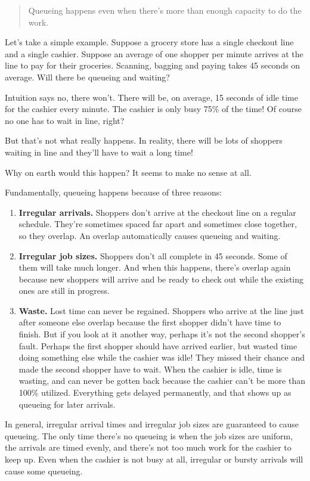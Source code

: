 \documentclass{vivid_layout_pdf}
\begin{document}
\begin{quote}
Queueing happens even when there's more than enough capacity to do the work.
\end{quote}

Let's take a simple example. Suppose a grocery store has a single checkout line and a single cashier. Suppose an average of one shopper per minute arrives at the line to pay for their groceries. Scanning, bagging and paying takes 45 seconds on average. Will there be queueing and waiting?

Intuition says no, there won't. There will be, on average, 15 seconds of idle time for the cashier every minute. The cashier is only busy 75\% of the time! Of course no one has to wait in line, right?

But that's not what really happens. In reality, there will be lots of shoppers waiting in line and they'll have to wait a long time!

Why on earth would this happen? It seems to make no sense at all.

Fundamentally, queueing happens because of three reasons:
\begin{enumerate}	%
\item {\bfseries Irregular arrivals.} Shoppers don't arrive at the checkout line on a regular schedule. They're sometimes spaced far apart and sometimes
close together, so they overlap. An overlap automatically causes
queueing and waiting.
\item {\bfseries Irregular job sizes.} Shoppers don't all complete in 45 seconds.
Some of them will take much longer. And when this happens, there's
overlap again because new shoppers will arrive and be ready to
check out while the existing ones are still in progress.
\item {\bfseries Waste.} Lost time can never be regained. Shoppers who arrive at the line just after someone else overlap because the first shopper didn't have time to finish. But if you look at it another way, perhaps it's not the second shopper's fault. Perhaps the first shopper should have arrived earlier, but wasted time doing something else while the cashier was idle! They missed their chance and made the second shopper have to wait. When the cashier is idle, time is wasting, and can never be gotten back because the cashier can't be more than 100\% utilized. Everything gets delayed permanently, and that shows up as queueing for later arrivals.
\end{enumerate}
In general, irregular arrival times and irregular job sizes are guaranteed to cause queueing.  The only time there's no queueing is when the job sizes are uniform, the arrivals are timed evenly, and there's not too much work for the cashier to keep up. Even when the cashier is not busy at all, irregular or bursty arrivals will cause some queueing.
\end{document}
